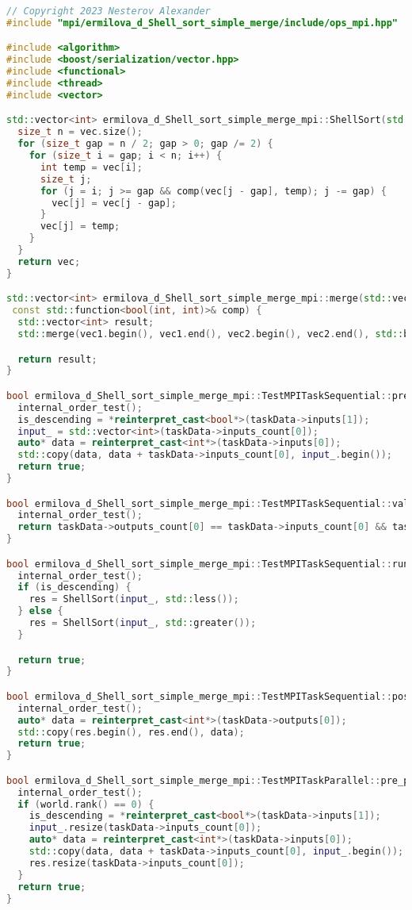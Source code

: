 \documentclass[a4paper,12pt]{article}
\begin{document}
\begin{lstlisting}[language=C++,caption={Параллельная версия }]
// Copyright 2023 Nesterov Alexander
#include "mpi/ermilova_d_Shell_sort_simple_merge/include/ops_mpi.hpp"

#include <algorithm>
#include <boost/serialization/vector.hpp>
#include <functional>
#include <thread>
#include <vector>

std::vector<int> ermilova_d_Shell_sort_simple_merge_mpi::ShellSort(std::vector<int>& vec, const std::function<bool(int, int)>& comp) {
  size_t n = vec.size();
  for (size_t gap = n / 2; gap > 0; gap /= 2) {
    for (size_t i = gap; i < n; i++) {
      int temp = vec[i];
      size_t j;
      for (j = i; j >= gap && comp(vec[j - gap], temp); j -= gap) {
        vec[j] = vec[j - gap];
      }
      vec[j] = temp;
    }
  }
  return vec;
}

std::vector<int> ermilova_d_Shell_sort_simple_merge_mpi::merge(std::vector<int>& vec1, std::vector<int>& vec2,
 const std::function<bool(int, int)>& comp) {
  std::vector<int> result;
  std::merge(vec1.begin(), vec1.end(), vec2.begin(), vec2.end(), std::back_inserter(result), comp);

  return result;
}

bool ermilova_d_Shell_sort_simple_merge_mpi::TestMPITaskSequential::pre_processing() {
  internal_order_test();
  is_descending = *reinterpret_cast<bool*>(taskData->inputs[1]);
  input_ = std::vector<int>(taskData->inputs_count[0]);
  auto* data = reinterpret_cast<int*>(taskData->inputs[0]);
  std::copy(data, data + taskData->inputs_count[0], input_.begin());
  return true;
}

bool ermilova_d_Shell_sort_simple_merge_mpi::TestMPITaskSequential::validation() {
  internal_order_test();
  return taskData->outputs_count[0] == taskData->inputs_count[0] && taskData->inputs_count[0] > 0;
}

bool ermilova_d_Shell_sort_simple_merge_mpi::TestMPITaskSequential::run() {
  internal_order_test();
  if (is_descending) {
    res = ShellSort(input_, std::less());
  } else {
    res = ShellSort(input_, std::greater());
  }

  return true;
}

bool ermilova_d_Shell_sort_simple_merge_mpi::TestMPITaskSequential::post_processing() {
  internal_order_test();
  auto* data = reinterpret_cast<int*>(taskData->outputs[0]);
  std::copy(res.begin(), res.end(), data);
  return true;
}

bool ermilova_d_Shell_sort_simple_merge_mpi::TestMPITaskParallel::pre_processing() {
  internal_order_test();
  if (world.rank() == 0) {
    is_descending = *reinterpret_cast<bool*>(taskData->inputs[1]);
    input_.resize(taskData->inputs_count[0]);
    auto* data = reinterpret_cast<int*>(taskData->inputs[0]);
    std::copy(data, data + taskData->inputs_count[0], input_.begin());
    res.resize(taskData->inputs_count[0]);
  }
  return true;
}


\end{lstlisting}
\end{document}

